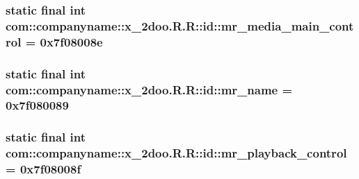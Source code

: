\hypertarget{classcom_1_1companyname_1_1x__2doo_1_1_r_1_1id_4d58c43d2cf2d413a36f7e36bda204e5}{
\subsubsection[{mr\_\-media\_\-main\_\-control}]{\setlength{\rightskip}{0pt plus 5cm}static final int com::companyname::x\_\-2doo.R.R::id::mr\_\-media\_\-main\_\-control = 0x7f08008e}}
\label{classcom_1_1companyname_1_1x__2doo_1_1_r_1_1id_4d58c43d2cf2d413a36f7e36bda204e5}


\hypertarget{classcom_1_1companyname_1_1x__2doo_1_1_r_1_1id_ee8501975b056a24b8e18b113d983676}{
\subsubsection[{mr\_\-name}]{\setlength{\rightskip}{0pt plus 5cm}static final int com::companyname::x\_\-2doo.R.R::id::mr\_\-name = 0x7f080089}}
\label{classcom_1_1companyname_1_1x__2doo_1_1_r_1_1id_ee8501975b056a24b8e18b113d983676}


\hypertarget{classcom_1_1companyname_1_1x__2doo_1_1_r_1_1id_0dc051b4a613e73c2fe8810de367438c}{
\subsubsection[{mr\_\-playback\_\-control}]{\setlength{\rightskip}{0pt plus 5cm}static final int com::companyname::x\_\-2doo.R.R::id::mr\_\-playback\_\-control = 0x7f08008f}}
\label{classcom_1_1companyname_1_1x__2doo_1_1_r_1_1id_0dc051b4a613e73c2fe8810de367438c}


